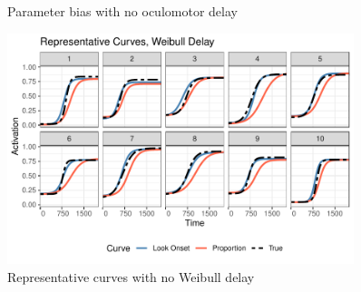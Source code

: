 \documentclass{beamer}
\begin{document}
\begin{frame}
\begin{figure}[H]
\centering
\caption{Parameter bias with no oculomotor delay}
\label{fig:par_bias_no_delay}
\end{figure}
\end{frame}



\begin{frame}
\begin{figure}[H]
\centering
\includegraphics[width=0.9\textwidth]{rep_curves_weibull_delay.pdf}
\caption{Representative curves with no Weibull delay}
\label{fig:rep_curves_no_delay}
\end{figure}
\end{frame}
\end{document}
